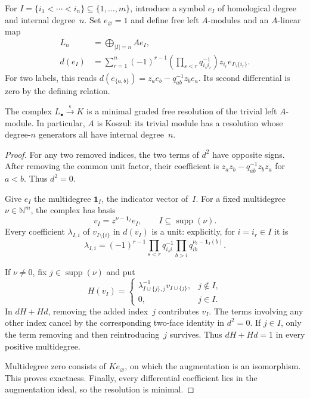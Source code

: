 For $I=\{i_1<\cdots<i_n\}\subseteq\{1,\ldots,m\}$, introduce a symbol
$e_I$ of homological degree and internal degree~$n$.
Set $e_\varnothing=1$ and define free left $A$-modules and an $A$-linear map
\begin{equation}\label{cbc:zf:koszul}
 \begin{split}
 L_n&=\bigoplus_{|I|=n} A e_I,\\
 d(e_I)&=\sum_{r=1}^n(-1)^{r-1}
       \left(\prod_{s<r}q_{i_s i_r}^{-1}\right)
       z_{i_r}e_{I\setminus\{i_r\}}.
 \end{split}
\end{equation}
For two labels, this reads
$d(e_{\{a,b\}})=z_a e_b-q_{ab}^{-1}z_b e_a$.
Its second differential is zero by the defining relation.

\begin{proposition}\label{cbc:zf:resolution}
The complex $L_\bullet\xrightarrow{\epsilon}K$ is a minimal graded free
resolution of the trivial left $A$-module.  In particular, $A$ is Koszul:
its trivial module has a resolution whose degree-$n$ generators all have
internal degree~$n$.
\end{proposition}
\begin{proof}
For any two removed indices, the two terms of $d^2$ have opposite signs.
After removing the common unit factor, their coefficient is
$z_a z_b-q_{ab}^{-1}z_b z_a$ for $a<b$.  Thus $d^2=0$.

Give $e_I$ the multidegree $\mathbf1_I$, the indicator vector of~$I$.
For a fixed multidegree $\nu\in\mathbb N^m$, the complex has basis
\[
 v_I=z^{\nu-\mathbf1_I}e_I,
 \qquad I\subseteq\operatorname{supp}(\nu).
\]
Every coefficient $\lambda_{I,i}$ of $v_{I\setminus\{i\}}$ in $d(v_I)$
is a unit: explicitly, for $i=i_r\in I$ it is
\[
 \lambda_{I,i}=(-1)^{r-1}
       \prod_{s<r}q_{i_s i}^{-1}
       \prod_{b>i}q_{ib}^{\nu_b-\mathbf1_I(b)}.
\]

If $\nu\ne0$, fix $j\in\operatorname{supp}(\nu)$ and put
\[
 H(v_I)=
 \begin{cases}
  \lambda_{I\cup\{j\},j}^{-1}v_{I\cup\{j\}},&j\notin I,\\
  0,&j\in I.
 \end{cases}
\]
In $dH+Hd$, removing the added index~$j$ contributes $v_I$.
The terms involving any other index cancel by the corresponding two-face
identity in $d^2=0$.  If $j\in I$, only the term removing and then
reintroducing~$j$ survives.  Thus $dH+Hd=1$ in every positive multidegree.

Multidegree zero consists of $K e_\varnothing$, on which the augmentation
is an isomorphism.  This proves exactness.  Finally, every differential
coefficient lies in the augmentation ideal, so the resolution is minimal.
\end{proof}

